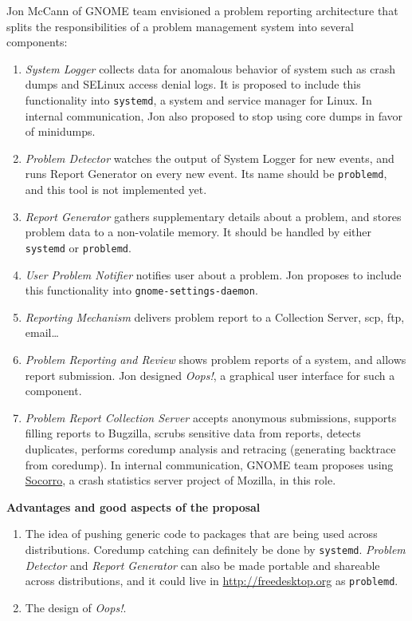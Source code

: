 \documentclass{article}
\begin{document}
Jon McCann of GNOME team envisioned a problem reporting
architecture\cite{JonProposal} that splits the responsibilities of a
problem management system into several components:
\begin{enumerate}
\item \emph{System Logger} collects data for anomalous behavior of
  system such as crash dumps and SELinux access denial logs.  It is
  proposed to include this functionality into \texttt{systemd}, a
  system and service manager for Linux.  In internal communication,
  Jon also proposed to stop using core dumps in favor of minidumps.
\item \emph{Problem Detector} watches the output of System Logger for
  new events, and runs Report Generator on every new event.  Its name
  should be \texttt{problemd}, and this tool is not implemented yet.
\item \emph{Report Generator} gathers supplementary details about a
  problem, and stores problem data to a non-volatile memory.  It
  should be handled by either \texttt{systemd} or \texttt{problemd}.
\item \emph{User Problem Notifier} notifies user about a problem.  Jon
  proposes to include this functionality into
  \texttt{gnome-settings-daemon}.
\item \emph{Reporting Mechanism} delivers problem report to a
  Collection Server, scp, ftp, email\ldots
\item \emph{Problem Reporting and Review} shows problem reports of a
  system, and allows report submission.  Jon designed
  \emph{Oops!}\cite{JonOops}, a graphical user interface for such a
  component.
\item \emph{Problem Report Collection Server} accepts anonymous
  submissions, supports filling reports to Bugzilla, scrubs sensitive
  data from reports, detects duplicates, performs coredump analysis
  and retracing (generating backtrace from coredump).  In internal
  communication, GNOME team proposes using
  \href{https://wiki.mozilla.org/Socorro}{Socorro}, a crash statistics
  server project of Mozilla, in this role.
\end{enumerate}

\textbf{Advantages and good aspects of the proposal}
\begin{enumerate}
\item The idea of pushing generic code to packages that are being used
  across distributions.  Coredump catching can definitely be done by
  \texttt{systemd}. \emph{Problem Detector} and \emph{Report
    Generator} can also be made portable and shareable across
  distributions, and it could live in \url{http://freedesktop.org} as
  \texttt{problemd}.
\item The design of \emph{Oops!}.
\end{enumerate}
\end{document}
